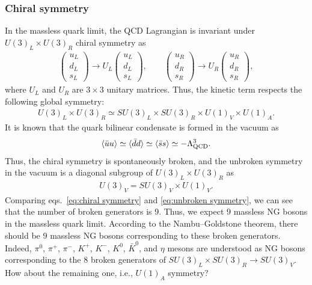\documentclass[11pt,a4paper]{article}
\begin{document}
\subsubsection{Chiral symmetry}
In the massless quark limit, the QCD Lagrangian is invariant under $U(3)_L \times U(3)_R$ chiral symmetry as
\begin{align}
\left(\begin{array}{c} u_L \\ d_L \\ s_L \end{array}\right) \to 
U_L \left(\begin{array}{c} u_L \\ d_L \\ s_L \end{array}\right), \qquad
\left(\begin{array}{c} u_R \\ d_R \\ s_R \end{array}\right) \to
U_R \left(\begin{array}{c} u_R \\ d_R \\ s_R \end{array}\right), \label{eq:chiral symmetry}
\end{align}
where $U_L$ and $U_R$ are $3\times 3$ unitary matrices. Thus, the kinetic term respects the following global symmetry:
\begin{align}
    U(3)_L \times U(3)_R \simeq SU(3)_L \times SU(3)_R \times U(1)_V \times U(1)_A. \label{eq:chiral symmetry}
\end{align}
It is known that the quark bilinear condensate is formed in the vacuum as
\begin{align}
    \langle \bar u u \rangle \simeq
    \langle \bar d d \rangle \simeq
    \langle \bar s s \rangle \simeq -\Lambda_{\rm QCD}^3.
\end{align}
Thus, the chiral symmetry is spontaneously broken, and the unbroken symmetry in the vacuum is a diagonal subgroup of $U(3)_L \times U(3)_R$ as
\begin{align}
    U(3)_V = SU(3)_V \times U(1)_V. \label{eq:unbroken symmetry}
\end{align}
Comparing eqs.~\eqref{eq:chiral symmetry} and \eqref{eq:unbroken symmetry}, we can see that the number of broken generators is 9. Thus, we expect 9 massless NG bosons in the massless quark limit. According to the Nambu--Goldstone theorem, there should be 9 massless NG bosons corresponding to these broken generators.
Indeed, $\pi^0$, $\pi^+$, $\pi^-$, $K^+$, $K^-$, $K^0$, $\bar K^0$, and $\eta$ mesons are understood as NG bosons corresponding to the 8 broken generators of $SU(3)_L \times SU(3)_R \to SU(3)_V$. How about the remaining one, i.e., $U(1)_A$ symmetry?
\end{document}
